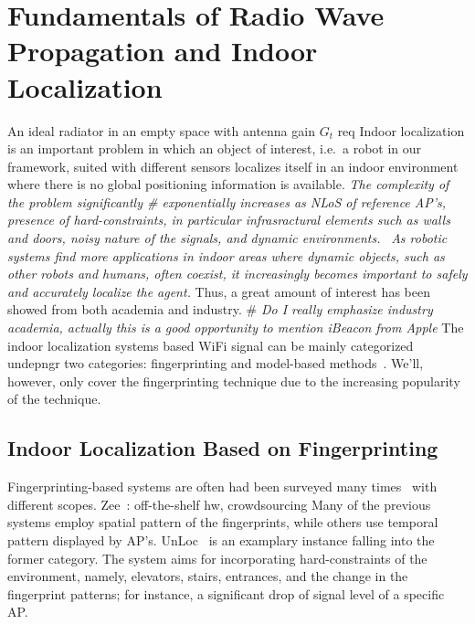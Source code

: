 \section{\label{sec-FU}Fundamentals of Radio Wave Propagation and Indoor Localization}
  An ideal radiator in an empty space with antenna gain $G_t$ req
  Indoor localization is an important problem in which an object of interest, i.e.\ a robot in our framework, suited with different sensors localizes itself in an indoor environment where there is no global positioning information is available.
  \textit{The complexity of the problem significantly \# \textit{exponentially} increases as NLoS of reference AP's, presence of hard-constraints, in particular infrasractural elements such as walls and doors, noisy nature of the signals, and dynamic environments.}~\cite{liu2007survey}
  \textit{As robotic systems find more applications in indoor areas where dynamic objects, such as other robots and humans, often coexist, it increasingly becomes important to safely and accurately localize the agent.} %
  Thus, a great amount of interest has been showed from both academia and industry.
  \# \textit{Do I really emphasize industry academia, actually this is a good opportunity to mention iBeacon from Apple}
  The indoor localization systems based WiFi signal can be mainly categorized undepngr two categories: fingerprinting and model-based methods~\cite{hossain2015survey}.
  We'll, however, only cover the fingerprinting technique due to the increasing popularity of the technique.

  \subsection{Indoor Localization Based on Fingerprinting}
    Fingerprinting-based systems are often   had been surveyed many times~\cite{he2016wi} with different scopes.
    Zee~\cite{rai2012zee}: off-the-shelf hw, crowdsourcing
    Many of the previous systems employ spatial pattern of the fingerprints, while others use temporal pattern displayed by AP's.
    UnLoc~\cite{wang2012no} is an examplary instance falling into the former category.
    The system aims for incorporating hard-constraints of the environment, namely, elevators, stairs, entrances, and the change in the fingerprint patterns; for instance, a significant drop of signal level of a specific AP\@.

